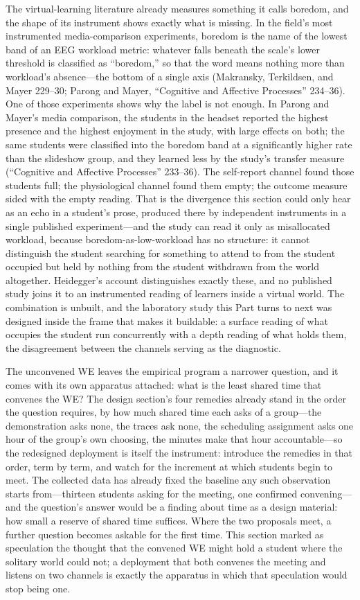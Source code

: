 The virtual-learning literature already measures something it calls
boredom, and the shape of its instrument shows exactly what is
missing. In the field's most instrumented media-comparison
experiments, boredom is the name of the lowest band of an EEG workload
metric: whatever falls beneath the scale's lower threshold is
classified as ``boredom,'' so that the word means nothing more than
workload's absence---the bottom of a single axis (Makransky,
Terkildsen, and Mayer 229--30; Parong and Mayer, ``Cognitive and
Affective Processes'' 234--36). One of those experiments shows why the
label is not enough. In Parong and Mayer's media comparison, the
students in the headset reported the highest presence and the highest
enjoyment in the study, with large effects on both; the same students
were classified into the boredom band at a significantly higher rate
than the slideshow group, and they learned less by the study's
transfer measure (``Cognitive and Affective Processes'' 233--36). The
self-report channel found those students full; the physiological
channel found them empty; the outcome measure sided with the empty
reading. That is the divergence this section could only hear as an
echo in a student's prose, produced there by independent instruments
in a single published experiment---and the study can read it only as
misallocated workload, because boredom-as-low-workload has no
structure: it cannot distinguish the student searching for something
to attend to from the student occupied but held by nothing from the
student withdrawn from the world altogether. Heidegger's account
distinguishes exactly these, and no published study joins it to an
instrumented reading of learners inside a virtual world. The
combination is unbuilt, and the laboratory study this Part turns to
next was designed inside the frame that makes it buildable: a surface
reading of what occupies the student run concurrently with a depth
reading of what holds them, the disagreement between the channels
serving as the diagnostic.

The unconvened WE leaves the empirical program a narrower question,
and it comes with its own apparatus attached: what is the least shared
time that convenes the WE? The design section's four remedies already
stand in the order the question requires, by how much shared time each
asks of a group---the demonstration asks none, the traces ask none,
the scheduling assignment asks one hour of the group's own choosing,
the minutes make that hour accountable---so the redesigned deployment
is itself the instrument: introduce the remedies in that order, term
by term, and watch for the increment at which students begin to meet.
The collected data has already fixed the baseline any such observation
starts from---thirteen students asking for the meeting, one confirmed
convening---and the question's answer would be a finding about
time as a design material: how small a reserve of shared
time suffices. Where the two proposals meet, a further question
becomes askable for the first time. This section marked as speculation
the thought that the convened WE might hold a student where the
solitary world could not; a deployment that both convenes the meeting
and listens on two channels is exactly the apparatus in which that
speculation would stop being one.

